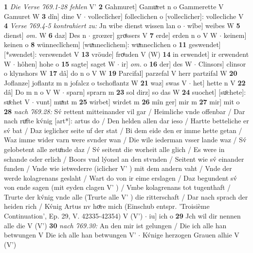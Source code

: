\documentclass[8pt,a4paper,notitlepage]{article}
\begin{document}
\begin{table}[ht]
\begin{minipage}[t]{0.5\linewidth}
\textbf{1} \textit{Die Verse 769.1-28 fehlen} V'  \textbf{2} Gahmuret] Gamuͯret n o Gammerette V Gamuret W \textbf{3} dîn] dine V  $\cdot$ volleclîcher] folleclichen o [volleclicher]: vollecliche V \textbf{4} \textit{Verse 769.4-5 kontrahiert zu:} Jn wibe dienst wissen lan o   $\cdot$ wîbe] weibes W \textbf{5} dienst] \textit{om.} W \textbf{6} daz] Des n  $\cdot$ grœzer] groͤssers V \textbf{7} erde] erden n o V W  $\cdot$ keinem] keinen o \textbf{8} wünneclîchem] [wuͯnneclichem]: wuͯnneclichen o \textbf{11} geswendet] [*swendet]: verswendet V \textbf{13} vröude] froͤuden V (W) \textbf{14} in erwendet] ir erwendent W  $\cdot$ hôhen] hohe o \textbf{15} sagte] saget W  $\cdot$ ir] \textit{om.} o \textbf{16} der] des W  $\cdot$ Clinsors] clinsor o klynshors W \textbf{17} dâ] do n o V W \textbf{19} Parcifal] parzefal V herr partzifal W \textbf{20} Joflanze] joflantz m n jofalcz o tschoflantz W \textbf{21} waz] swas V  $\cdot$ het] hette n V \textbf{22} dâ] Do m n o V W  $\cdot$ sparn] sprarn m \textbf{23} sol dirz] so das W \textbf{24} suochet] [suͦchete]: suͦchet V  $\cdot$ vunt] muͯnt m \textbf{25} wirbet] wirdet m \textbf{26} mîn ger] mir m \textbf{27} mir] mit o \textbf{28} \textit{nach 769.28:} Sv́ rettent mitteinander vil gar / Heimliche vnde offenbar / Dar nach ruͦfte kv́nig [art*]: artus do / Den helden allen dar ieso / Hartte betteliche er sv́ bat / Daz ieglicher seite uf der stat / Bi dem eide den er imme hette getan / Waz imme wider varn were svnder wan / Die wile iederman vsser lande waz / Sv́ gelobetent alle zetuͦnde daz / Sv́ seitent die worheit alle glich / Es were in schande oder erlich / Boors vnd lýonel an den stvnden / Seitent wie sv́ einander funden / Vnde wie ietwederre (iclicher V'  ) mit dem andern vaht / Vnde der werde kolagrenans geslaht / Wart do von ir eime erslagen / Daz begundent sv́ von ende sagen (mit eyden clagen V'  ) / Vmbe kolagrenans tot tugenthaft / Trurte der kv́nig vnde alle (Trurte alle V'  ) die ritterschaft / Dar nach sprach der heiden rich / Kv́nig Artus nv hoͤre mich (Einschub entspr. 'Troisième Continuation', Ep. 29, V. 42335-42354) V (V')   $\cdot$ iu] ich o \textbf{29} Jch wil dir nennen alle die V (V') \textbf{30} \textit{nach 769.30:} An den mir ist gelungen / Die ich alle han betwungen V  Die ich alle han betwungen V'   $\cdot$ Kv́nige herzogen Grauen alhie V (V') \newline
\end{minipage}
\end{table}
\newpage
\end{document}
